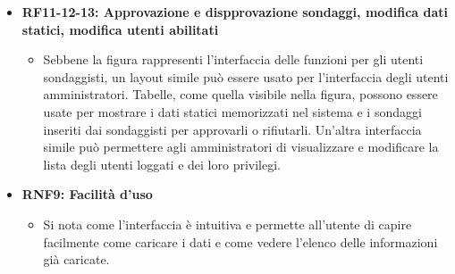 \begin{itemize}
\begin{itemize}
        \end{itemize}
        \item \textbf{RF11-12-13: Approvazione e dispprovazione sondaggi, modifica dati statici, modifica utenti abilitati} \begin{itemize}
            \item Sebbene la figura rappresenti l'interfaccia delle funzioni per gli utenti sondaggisti, un layout simile può essere usato per l'interfaccia degli utenti amministratori. Tabelle, come quella visibile nella figura, possono essere usate per mostrare i dati statici memorizzati nel sistema e i sondaggi inseriti dai sondaggisti per approvarli o rifiutarli. Un'altra interfaccia simile può permettere agli amministratori di visualizzare e modificare la lista degli utenti loggati e dei loro privilegi.
        \end{itemize} 
        \item \textbf{RNF9: Facilità d’uso} \begin{itemize}
            \item Si nota come l'interfaccia è intuitiva e permette all'utente di capire facilmente come caricare i dati e come vedere l'elenco delle informazioni già caricate.
        \end{itemize}
    \end{itemize}
